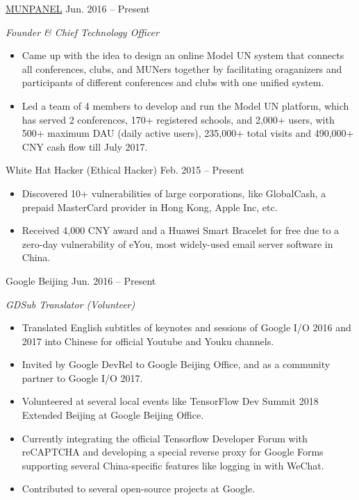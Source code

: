 \documentclass[hidelinks__VERSION__]{adamyi-cv}
\begin{document}
\begin{entrylist}


\entry
{\href{https://www.munpanel.com}{MUNPANEL}}
{Jun. 2016 -- Present}
{\emph{Founder \& Chief Technology Officer}
\begin{itemize}
\item Came up with the idea to design an online Model UN system that connects all conferences, clubs, and MUNers together by facilitating oraganizers and participants of different conferences and clubs with one unified system.
\item Led a team of 4 members to develop and run the Model UN platform, which has served 2 conferences, 170+ registered schools, and 2,000+ users, with 500+ maximum DAU (daily active users), 235,000+ total visits and 490,000+ CNY cash flow till July 2017.
\end{itemize}}


\entry
{White Hat Hacker (Ethical Hacker)}
{Feb. 2015 -- Present}
{\begin{itemize}
\item Discovered 10+ vulnerabilities of large corporations, like GlobalCash, a prepaid MasterCard provider in Hong Kong, Apple Inc, etc.
\item Received 4,000 CNY award and a Huawei Smart Bracelet for free due to a zero-day vulnerability of eYou, most widely-used email server software in China.
\end{itemize}}


\entry
{Google Beijing}
{Jun. 2016 -- Present}
{\emph{GDSub Translator (Volunteer)}
\begin{itemize}
\item Translated English subtitles of keynotes and sessions of Google I/O 2016 and 2017 into Chinese for official Youtube and Youku channels.
\item Invited by Google DevRel to Google Beijing Office, and as a community partner to Google I/O 2017.
\item Volunteered at several local events like TensorFlow Dev Summit 2018 Extended Beijing at Google Beijing Office.
\item Currently integrating the official Tensorflow Developer Forum with reCAPTCHA and developing a special reverse proxy for Google Forms supporting several China-specific features like logging in with WeChat.
\item Contributed to several open-source projects at Google.
\end{itemize}}


\end{entrylist}
\end{document}
